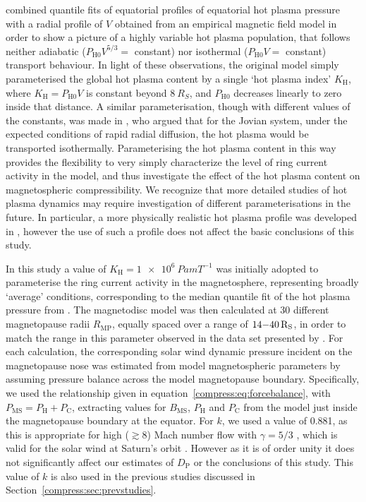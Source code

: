 \citet{achilleos2010a} combined quantile fits of equatorial profiles of equatorial hot plasma pressure \citet{sergis2007} with a radial profile of $V$ obtained from an empirical magnetic field model \citep{bunce2007} in order to show a picture of a highly variable hot plasma population, that follows neither adiabatic ($P_\mathrm{H0}V^{5/3} =$ constant) nor isothermal ($P_\mathrm{H0}V =$ constant) transport behaviour. In light of these observations, the original \citet{achilleos2010a} model simply parameterised the global hot plasma content by a single `hot plasma index' $K_\mathrm{H}$, where $ K_\mathrm{H}= P_\mathrm{H0}V$ is constant beyond $\SI{8}{R_S}$, and $P_\mathrm{H0}$ decreases linearly to zero inside that distance. A similar parameterisation, though with different values of the constants, was made in \citet{caudal1986}, who argued that for the Jovian system, under the expected conditions of rapid radial diffusion, the hot plasma would be transported isothermally. Parameterising the hot plasma content in this way provides the flexibility to very simply characterize the level of ring current activity in the model, and thus investigate the effect of the hot plasma content on magnetospheric compressibility. We recognize that more detailed studies of hot plasma dynamics may require investigation of different parameterisations in the future. In particular, a more physically realistic hot plasma profile was developed in \citet{achilleos2010b}, however the use of such a profile does not affect the basic conclusions of this study.

In this study a value of $K_\mathrm{H}=\SI{1e6}{Pa m T^{-1}}$ was initially adopted to parameterise the ring current activity in the magnetosphere, representing broadly `average' conditions, corresponding to the median quantile fit of the hot plasma pressure from \citet{sergis2007}. The magnetodisc model was then calculated at 30 different magnetopause radii $R_\mathrm{MP}$, equally spaced over a range of $14{\--}\SI{40}{R_S}$, in order to match the range in this parameter observed in the data set presented by \citet{pilkington2015}. For each calculation, the corresponding solar wind dynamic pressure incident on the magnetopause nose was estimated from model magnetospheric parameters by assuming pressure balance across the model magnetopause boundary. Specifically, we used the relationship given in equation~\ref{compress:eq:forcebalance}, with $P_{\mathrm{MS}}=P_\mathrm{H}+P_\mathrm{C}$, extracting values for $B_\mathrm{MS}$, $P_\mathrm{H}$ and $P_\mathrm{C}$ from the model just inside the magnetopause boundary at the equator. For $k$, we used a value of 0.881, as this is appropriate for high ($\gtrsim 8$) Mach number flow with $\gamma = 5/3$  \citep{spreiter1966}, which is valid for the solar wind at Saturn's orbit \cite[e.g.][]{slavin1985,achilleos2006}. However as it is of order unity it does not significantly affect our estimates of $D_\mathrm{P}$ or the conclusions of this study. This value of $k$ is also used in the previous studies discussed in Section~\ref{compress:sec:prevstudies}.

